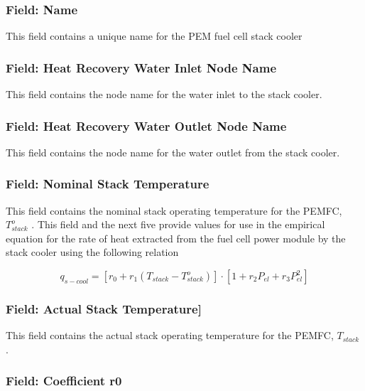 \subsubsection{Field: Name}\label{field-name-15-001}

This field contains a unique name for the PEM fuel cell stack cooler

\subsubsection{Field: Heat Recovery Water Inlet Node Name}\label{field-heat-recovery-water-inlet-node-name-1}

This field contains the node name for the water inlet to the stack cooler.

\subsubsection{Field: Heat Recovery Water Outlet Node Name}\label{field-heat-recovery-water-outlet-node-nane}

This field contains the node name for the water outlet from the stack cooler.

\subsubsection{Field: Nominal Stack Temperature}\label{field-nominal-stack-temperature}

This field contains the nominal stack operating temperature for the PEMFC, \(T_{stack}^o\) . This field and the next five provide values for use in the empirical equation for the rate of heat extracted from the fuel cell power module by the stack cooler using the following relation

\begin{equation}
{q_{s - cool}} = \left[ {{r_0} + {r_1}\left( {{T_{stack}} - T_{stack}^o} \right)} \right] \cdot \left[ {1 + {r_2}{P_{el}} + {r_3}P_{el}^2} \right]
\end{equation}

\subsubsection{Field: Actual Stack Temperature{]}}\label{field-actual-stack-temperature}

This field contains the actual stack operating temperature for the PEMFC, \({T_{stack}}\) .

\subsubsection{Field: Coefficient r0}\label{field-coefficient-r0}

